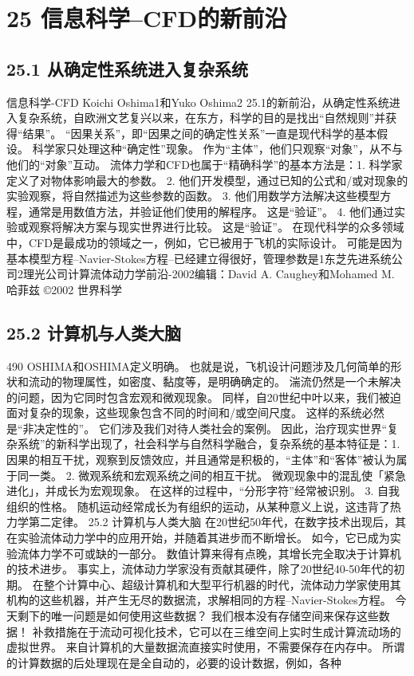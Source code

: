 \documentclass[UTF8,11pt,a4paper,openany,fontset=fandol]{ctexbook}
\begin{document}
\clearpage
\chapter{25 信息科学--CFD的新前沿}
\section{25.1 从确定性系统进入复杂系统}
信息科学-CFD Koichi Oshima1和Yuko Oshima2 25.1的新前沿，从确定性系统进入复杂系统，自欧洲文艺复兴以来，在东方，科学的目的是找出“自然规则”并获得“结果”。 “因果关系”，即“因果之间的确定性关系”一直是现代科学的基本假设。 科学家只处理这种“确定性”现象。 作为“主体”，他们只观察“对象”，从不与他们的“对象”互动。 流体力学和CFD也属于“精确科学”的基本方法是：1. 科学家定义了对物体影响最大的参数。 2. 他们开发模型，通过已知的公式和/或对现象的实验观察，将自然描述为这些参数的函数。 3. 他们用数学方法解决这些模型方程，通常是用数值方法，并验证他们使用的解程序。 这是“验证”。 4. 他们通过实验或观察将解决方案与现实世界进行比较。 这是“验证”。 在现代科学的众多领域中，CFD是最成功的领域之一，例如，它已被用于飞机的实际设计。 可能是因为基本模型方程--Navier-Stokes方程--已经建立得很好，管理参数是1东芝先进系统公司2理光公司计算流体动力学前沿-2002编辑：David A. Caughey和Mohamed M. 哈菲兹 ©2002 世界科学

\section{25.2 计算机与人类大脑}
490 OSHIMA和OSHIMA定义明确。 也就是说，飞机设计问题涉及几何简单的形状和流动的物理属性，如密度、黏度等，是明确确定的。 湍流仍然是一个未解决的问题，因为它同时包含宏观和微观现象。 同样，自20世纪中叶以来，我们被迫面对复杂的现象，这些现象包含不同的时间和/或空间尺度。 这样的系统必然是“非决定性的”。 它们涉及我们对待人类社会的案例。 因此，治疗现实世界“复杂系统”的新科学出现了，社会科学与自然科学融合，复杂系统的基本特征是：1. 因果的相互干扰，观察到反馈效应，并且通常是积极的，“主体”和“客体”被认为属于同一类。 2. 微观系统和宏观系统之间的相互干扰。 微观现象中的混乱使「紧急进化」，并成长为宏观现象。 在这样的过程中，“分形字符”经常被识别。 3. 自我组织的性格。 随机运动经常成长为有组织的运动，从某种意义上说，这违背了热力学第二定律。 25.2 计算机与人类大脑 在20世纪50年代，在数字技术出现后，其在实验流体动力学中的应用开始，并随着其进步而不断增长。 如今，它已成为实验流体力学不可或缺的一部分。 数值计算来得有点晚，其增长完全取决于计算机的技术进步。 事实上，流体动力学家没有贡献其硬件，除了20世纪40-50年代的初期。 在整个计算中心、超级计算机和大型平行机器的时代，流体动力学家使用其机构的这些机器，并产生无尽的数据流，求解相同的方程--Navier-Stokes方程。 今天剩下的唯一问题是如何使用这些数据？ 我们根本没有存储空间来保存这些数据！ 补救措施在于流动可视化技术，它可以在三维空间上实时生成计算流动场的虚拟世界。 来自计算机的大量数据流直接实时使用，不需要保存在内存中。 所谓的计算数据的后处理现在是全自动的，必要的设计数据，例如，各种
\end{document}
